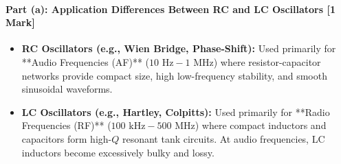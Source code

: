 \documentclass[11pt,a4paper,oneside]{book}
\begin{document}
\paragraph{Part (a): Application Differences Between RC and LC Oscillators [1 Mark]}
\begin{itemize}[leftmargin=1.5em]
  \item \textbf{RC Oscillators (e.g., Wien Bridge, Phase-Shift):} Used primarily for **Audio Frequencies (AF)** ($10\text{ Hz} - 1\text{ MHz}$) where resistor-capacitor networks provide compact size, high low-frequency stability, and smooth sinusoidal waveforms.
  \item \textbf{LC Oscillators (e.g., Hartley, Colpitts):} Used primarily for **Radio Frequencies (RF)** ($100\text{ kHz} - 500\text{ MHz}$) where compact inductors and capacitors form high-$Q$ resonant tank circuits. At audio frequencies, LC inductors become excessively bulky and lossy.
\end{itemize}
\end{document}
